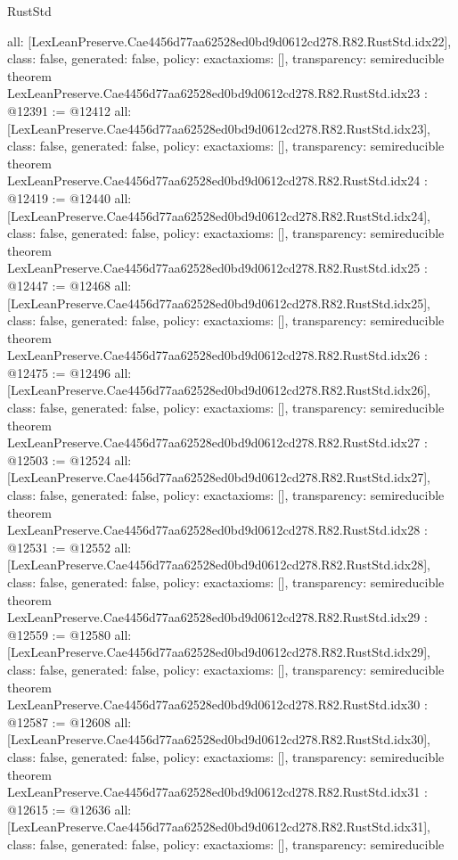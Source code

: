 \begin{lexlean}{RustStd}
\begin{coremodule}
{  all: [LexLeanPreserve.Cae4456d77aa62528ed0bd9d0612cd278.R82.RustStd.idx22],
  class: false,
  generated: false,
  policy: exact{axioms: []},
  transparency: semireducible
}
theorem LexLeanPreserve.Cae4456d77aa62528ed0bd9d0612cd278.R82.RustStd.idx23 : @12391 := @12412 {
  all: [LexLeanPreserve.Cae4456d77aa62528ed0bd9d0612cd278.R82.RustStd.idx23],
  class: false,
  generated: false,
  policy: exact{axioms: []},
  transparency: semireducible
}
theorem LexLeanPreserve.Cae4456d77aa62528ed0bd9d0612cd278.R82.RustStd.idx24 : @12419 := @12440 {
  all: [LexLeanPreserve.Cae4456d77aa62528ed0bd9d0612cd278.R82.RustStd.idx24],
  class: false,
  generated: false,
  policy: exact{axioms: []},
  transparency: semireducible
}
theorem LexLeanPreserve.Cae4456d77aa62528ed0bd9d0612cd278.R82.RustStd.idx25 : @12447 := @12468 {
  all: [LexLeanPreserve.Cae4456d77aa62528ed0bd9d0612cd278.R82.RustStd.idx25],
  class: false,
  generated: false,
  policy: exact{axioms: []},
  transparency: semireducible
}
theorem LexLeanPreserve.Cae4456d77aa62528ed0bd9d0612cd278.R82.RustStd.idx26 : @12475 := @12496 {
  all: [LexLeanPreserve.Cae4456d77aa62528ed0bd9d0612cd278.R82.RustStd.idx26],
  class: false,
  generated: false,
  policy: exact{axioms: []},
  transparency: semireducible
}
theorem LexLeanPreserve.Cae4456d77aa62528ed0bd9d0612cd278.R82.RustStd.idx27 : @12503 := @12524 {
  all: [LexLeanPreserve.Cae4456d77aa62528ed0bd9d0612cd278.R82.RustStd.idx27],
  class: false,
  generated: false,
  policy: exact{axioms: []},
  transparency: semireducible
}
theorem LexLeanPreserve.Cae4456d77aa62528ed0bd9d0612cd278.R82.RustStd.idx28 : @12531 := @12552 {
  all: [LexLeanPreserve.Cae4456d77aa62528ed0bd9d0612cd278.R82.RustStd.idx28],
  class: false,
  generated: false,
  policy: exact{axioms: []},
  transparency: semireducible
}
theorem LexLeanPreserve.Cae4456d77aa62528ed0bd9d0612cd278.R82.RustStd.idx29 : @12559 := @12580 {
  all: [LexLeanPreserve.Cae4456d77aa62528ed0bd9d0612cd278.R82.RustStd.idx29],
  class: false,
  generated: false,
  policy: exact{axioms: []},
  transparency: semireducible
}
theorem LexLeanPreserve.Cae4456d77aa62528ed0bd9d0612cd278.R82.RustStd.idx30 : @12587 := @12608 {
  all: [LexLeanPreserve.Cae4456d77aa62528ed0bd9d0612cd278.R82.RustStd.idx30],
  class: false,
  generated: false,
  policy: exact{axioms: []},
  transparency: semireducible
}
theorem LexLeanPreserve.Cae4456d77aa62528ed0bd9d0612cd278.R82.RustStd.idx31 : @12615 := @12636 {
  all: [LexLeanPreserve.Cae4456d77aa62528ed0bd9d0612cd278.R82.RustStd.idx31],
  class: false,
  generated: false,
  policy: exact{axioms: []},
  transparency: semireducible
}
\end{coremodule}
\end{lexlean}
